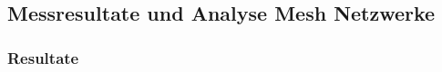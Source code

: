\vspace*{4cm}
\begin{center}
\part{Messresultate und Analyse Mesh Netzwerke}
\end{center}
\vspace*{\fill}
\clearpage

\section{Resultate}\label{sec:Resultate}







